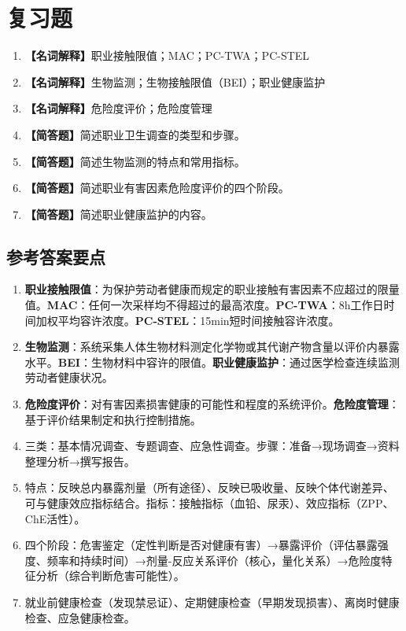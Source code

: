 \section{复习题}

\begin{enumerate}[leftmargin=*, itemsep=8pt]
    \item \textbf{【名词解释】}职业接触限值；MAC；PC-TWA；PC-STEL
    \item \textbf{【名词解释】}生物监测；生物接触限值（BEI）；职业健康监护
    \item \textbf{【名词解释】}危险度评价；危险度管理
    \item \textbf{【简答题】}简述职业卫生调查的类型和步骤。
    \item \textbf{【简答题】}简述生物监测的特点和常用指标。
    \item \textbf{【简答题】}简述职业有害因素危险度评价的四个阶段。
    \item \textbf{【简答题】}简述职业健康监护的内容。
\end{enumerate}

\subsection*{参考答案要点}

\begin{enumerate}[leftmargin=*]
    \item \textbf{职业接触限值}：为保护劳动者健康而规定的职业接触有害因素不应超过的限量值。\textbf{MAC}：任何一次采样均不得超过的最高浓度。\textbf{PC-TWA}：8h工作日时间加权平均容许浓度。\textbf{PC-STEL}：15min短时间接触容许浓度。
    \item \textbf{生物监测}：系统采集人体生物材料测定化学物或其代谢产物含量以评价内暴露水平。\textbf{BEI}：生物材料中容许的限值。\textbf{职业健康监护}：通过医学检查连续监测劳动者健康状况。
    \item \textbf{危险度评价}：对有害因素损害健康的可能性和程度的系统评价。\textbf{危险度管理}：基于评价结果制定和执行控制措施。
    \item 三类：基本情况调查、专题调查、应急性调查。步骤：准备→现场调查→资料整理分析→撰写报告。
    \item 特点：反映总内暴露剂量（所有途径）、反映已吸收量、反映个体代谢差异、可与健康效应指标结合。指标：接触指标（血铅、尿汞）、效应指标（ZPP、ChE活性）。
    \item 四个阶段：危害鉴定（定性判断是否对健康有害）→暴露评价（评估暴露强度、频率和持续时间）→剂量-反应关系评价（核心，量化关系）→危险度特征分析（综合判断危害可能性）。
    \item 就业前健康检查（发现禁忌证）、定期健康检查（早期发现损害）、离岗时健康检查、应急健康检查。
\end{enumerate}

\newpage

\newpage